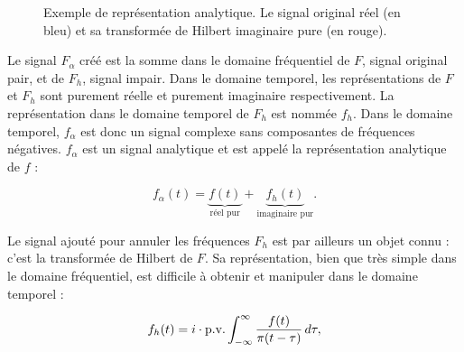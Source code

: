 \begin{figure}[h]
    \centering

    \caption[Signal analytique pour un signal complexe]{Exemple de représentation analytique. Le signal original réel (en bleu) et sa transformée de Hilbert imaginaire pure (en rouge).}
    \label{fig:analytic-representation}
\end{figure}

Le signal $F_{\alpha}$ créé est la somme dans le domaine fréquentiel de $F$, signal original pair, et de $F_h$, signal impair. Dans le domaine temporel, les représentations de $F$
et $F_h$ sont purement réelle et purement imaginaire respectivement. La représentation dans le domaine temporel de $F_h$ est nommée $f_h$. Dans le domaine temporel, $f_{\alpha}$ est donc un signal complexe sans composantes de fréquences négatives. $f_\alpha$ est un signal analytique et est appelé la représentation analytique de $f$ :

\begin{equation}
    f_{\alpha}(t) = \underbrace{f(t)}_\text{réel pur} + \underbrace{f_h(t)}_\text{imaginaire pur}.
\end{equation}

\noindent Le signal ajouté pour annuler les fréquences $F_h$ est par ailleurs un objet connu : c'est la transformée de Hilbert de $F$. Sa représentation, bien que très simple dans le domaine fréquentiel, est difficile à obtenir et manipuler dans le domaine temporel :

\begin{equation}
    f_h(t) = i \cdot \textnormal{p.v.} \int_{-\infty}^{\infty} \frac{f(t)}{\pi(t-\tau)} \,d\tau,
\end{equation}

